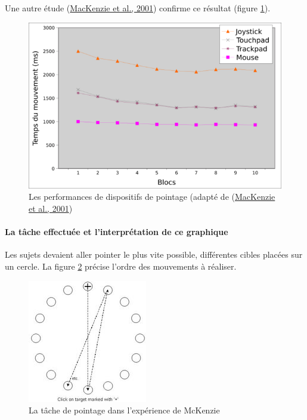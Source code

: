 \documentclass[
]{book}
\begin{document}
Une autre étude (\protect\hyperlink{ref-mackenzie2001accuracy}{MacKenzie et al., 2001}) confirme ce résultat (figure \ref{fig:performances}).

\begin{figure}
\centering
\includegraphics{img/comparaison.png}
\caption{\label{fig:performances}Les performances de dispositifs de pointage (adapté de (\protect\hyperlink{ref-mackenzie2001accuracy}{MacKenzie et al., 2001})}
\end{figure}

\hypertarget{la-tuxe2che-effectuuxe9e-et-linterpruxe9tation-de-ce-graphique}{%
\paragraph*{La tâche effectuée et l'interprétation de ce graphique}\label{la-tuxe2che-effectuuxe9e-et-linterpruxe9tation-de-ce-graphique}}

Les sujets devaient aller pointer le plus vite possible, différentes
cibles placées sur un cercle. La figure \ref{fig:Latache} précise l'ordre des
mouvements à réaliser.

\begin{figure}
\centering
\includegraphics{img/CHI01-f6.jpg}
\caption{\label{fig:Latache}La tâche de pointage dans l'expérience de
McKenzie}
\end{figure}
\end{document}
